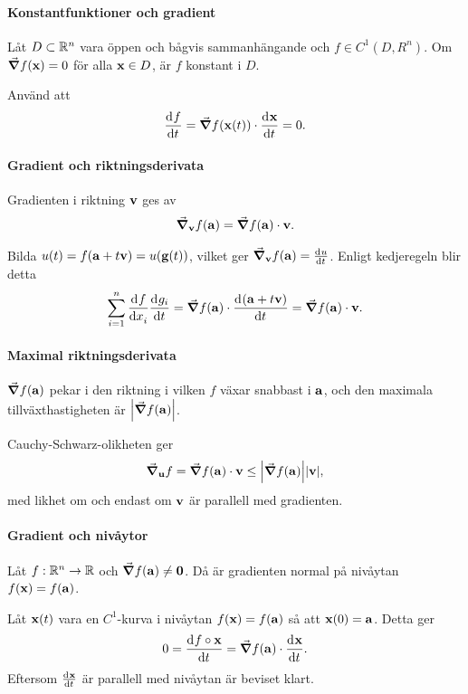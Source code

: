 \proof

\paragraph{Konstantfunktioner och gradient}
Låt $D\subset\mathbb{R}^n$ vara öppen och bågvis sammanhängande och $f\in C^1(D, R^n)$. Om $\grad{f(\vect{x})} = 0$ för alla $\vect{x}\in D$, är $f$ konstant i $D$.

\proof
Använd att
\begin{align*}
	\deval{f}{t}{\vect{x}(t)} = \grad{f(\vect{x}(t))}\cdot\deval{\vect{x}}{t}{t} = 0.
\end{align*}

\paragraph{Gradient och riktningsderivata}
Gradienten i riktning $\vect{v}$ ges av
\begin{align*}
	\grad_{\vect{v}}f(\vect{a}) = \grad{f}(\vect{a})\cdot\vect{v}.
\end{align*}

\proof
Bilda $u(t) = f(\vect{a} + t\vect{v}) = u(\vect{g}(t))$, vilket ger $\grad_{\vect{v}}f(\vect{a}) = \deval{u}{t}{0}$. Enligt kedjeregeln blir detta
\begin{align*}
	\sum\limits_{i = 1}^{n}\deval{f}{x_i}{0}\deval{g_i}{t}{0} = \grad{f}(\vect{a})\cdot\deval{(\vect{a} + t\vect{v})}{t}{0} = \grad{f}(\vect{a})\cdot\vect{v}.
\end{align*}

\paragraph{Maximal riktningsderivata}
$\grad{f(\vect{a})}$ pekar i den riktning i vilken $f$ växar snabbast i $\vect{a}$, och den maximala tillväxthastigheten är $\abs{\grad{f(\vect{a})}}$.

\proof
Cauchy-Schwarz-olikheten ger
\begin{align*}
	\grad_{\vect{u}}f = \grad{f}(\vect{a})\cdot\vect{v}\leq\abs{\grad{f}(\vect{a})}\abs{\vect{v}},
\end{align*}
med likhet om och endast om $\vect{v}$ är parallell med gradienten.

\paragraph{Gradient och nivåytor}
Låt $f: \mathbb{R}^n\to\mathbb{R}$ och $\grad{f}(\vect{a})\neq\vect{0}$. Då är gradienten normal på nivåytan $f(\vect{x}) = f(\vect{a})$.

\proof
Låt $\vect{x}(t)$ vara en $C^1$-kurva i nivåytan $f(\vect{x}) = f(\vect{a})$ så att $\vect{x}(0) = \vect{a}$. Detta ger
\begin{align*}
	0 = \deval{f\circ \vect{x}}{t}{0} = \grad{f}(\vect{a})\cdot\deval{\vect{x}}{t}{0}.
\end{align*}
Eftersom $\deval{\vect{x}}{t}{0}$ är parallell med nivåytan är beviset klart.